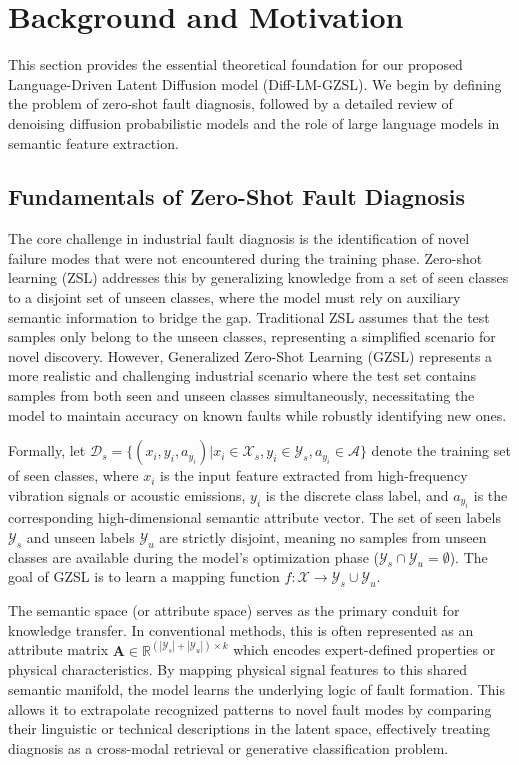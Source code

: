 \section{Background and Motivation}
\label{sec:background}

This section provides the essential theoretical foundation for our proposed Language-Driven Latent Diffusion model (Diff-LM-GZSL). We begin by defining the problem of zero-shot fault diagnosis, followed by a detailed review of denoising diffusion probabilistic models and the role of large language models in semantic feature extraction.

\subsection{Fundamentals of Zero-Shot Fault Diagnosis}
\label{subsec:zsl_fundamentals}

The core challenge in industrial fault diagnosis is the identification of novel failure modes that were not encountered during the training phase. Zero-shot learning (ZSL) addresses this by generalizing knowledge from a set of seen classes to a disjoint set of unseen classes, where the model must rely on auxiliary semantic information to bridge the gap. Traditional ZSL assumes that the test samples only belong to the unseen classes, representing a simplified scenario for novel discovery. However, Generalized Zero-Shot Learning (GZSL) represents a more realistic and challenging industrial scenario where the test set contains samples from both seen and unseen classes simultaneously, necessitating the model to maintain accuracy on known faults while robustly identifying new ones.

Formally, let $\mathcal{D}_s = \{(x_i, y_i, a_{y_i}) | x_i \in \mathcal{X}_s, y_i \in \mathcal{Y}_s, a_{y_i} \in \mathcal{A}\}$ denote the training set of seen classes, where $x_i$ is the input feature extracted from high-frequency vibration signals or acoustic emissions, $y_i$ is the discrete class label, and $a_{y_i}$ is the corresponding high-dimensional semantic attribute vector. The set of seen labels $\mathcal{Y}_s$ and unseen labels $\mathcal{Y}_u$ are strictly disjoint, meaning no samples from unseen classes are available during the model's optimization phase ($\mathcal{Y}_s \cap \mathcal{Y}_u = \emptyset$). The goal of GZSL is to learn a mapping function $f: \mathcal{X} \to \mathcal{Y}_s \cup \mathcal{Y}_u$.

The semantic space (or attribute space) serves as the primary conduit for knowledge transfer. In conventional methods, this is often represented as an attribute matrix $\mathbf{A} \in \mathbb{R}^{(|\mathcal{Y}_s| + |\mathcal{Y}_u|) \times k}$ which encodes expert-defined properties or physical characteristics. By mapping physical signal features to this shared semantic manifold, the model learns the underlying logic of fault formation. This allows it to extrapolate recognized patterns to novel fault modes by comparing their linguistic or technical descriptions in the latent space, effectively treating diagnosis as a cross-modal retrieval or generative classification problem.

